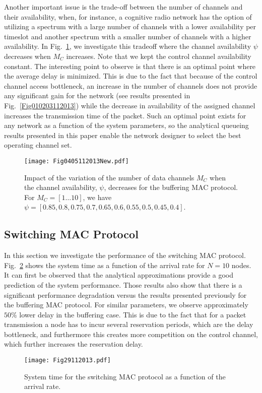 \documentclass[12pt,journal,oneside,onecolumn]{IEEEtran}
\begin{document}
Another important issue is the trade-off between the 
number of channels and their availability, when, for instance, 
a cognitive radio network has the option of utilizing a spectrum with a large number of 
channels with a lower availability per timeslot and another spectrum with a 
smaller number of channels with a higher availability.  In Fig.~\ref{Fig0405112013}, we investigate
this tradeoff where the channel availability $\psi$ decreases when $M_C$ increases.  Note that 
we kept the control channel availability constant.
The interesting point to observe is that there is
an optimal point where the average delay is minimized. 
This is due to the fact that because of the control channel access bottleneck, an 
increase in the number of channels does not provide 
any significant gain for the network (see results presented in Fig.~\ref{Fig010203112013}) 
while the decrease in 
availability of the assigned channel increases the transmission time of the packet. 
Such an optimal point exists for any network as a 
function of the system parameters, 
so the analytical queueing results presented in this paper enable the network designer to select the best operating channel set.
\begin{figure}\texttt{[image: Fig0405112013New.pdf]}\caption{Impact of the variation of the number of data channels $M_C$ when the channel availability, $\psi$, decreases for the buffering MAC protocol. For $M_C=[1\dots 10]$, we have $\psi=[0.85, 0.8, 0.75, 0.7, 0.65, 0.6, 0.55, 0.5, 0.45, 0.4]$.}\label{Fig0405112013}\end{figure}







\subsection{Switching MAC Protocol}
\label{sec:sim-switch}

In this section we investigate the performance of the switching MAC protocol. 
Fig.~\ref{Fig29112013} shows the system time as a function of the arrival rate for $N=10$ nodes.
It can first be observed that the analytical approximations provide a good prediction of the 
system performance.
Those results also show that there is a significant performance degradation versus
the results presented previously for the buffering MAC protocol. For similar parameters, we observe approximately $50\%$ lower delay in the buffering case. 
This is due to the fact that for a packet transmission a node has to incur several reservation periods, which
are the delay bottleneck, and furthermore this creates more competition on the control channel, which further
increases the reservation delay.
\begin{figure}\texttt{[image: Fig29112013.pdf]}\caption{System time for the switching MAC protocol as a function of the arrival rate.}\label{Fig29112013}\end{figure}
\end{document}
